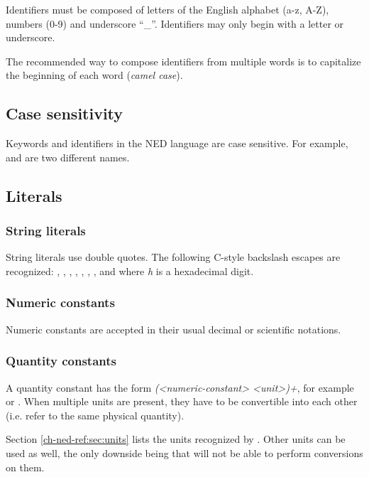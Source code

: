 Identifiers must be composed of letters of the English alphabet (a-z, A-Z),
numbers (0-9) and underscore ``\_''. Identifiers may only begin with a
letter or underscore.

The recommended way to compose identifiers from multiple words is to
capitalize the beginning of each word (\textit{camel case}).

\subsection{Case sensitivity}

Keywords and identifiers in the NED language are case sensitive. For example,
 and  are two different names.

\subsection{Literals}

\subsubsection{String literals}

String literals use double quotes. The following C-style backslash
escapes are recognized: , , , ,
, \ttt{{\textbackslash}{\textbackslash}}, , and  where \textit{h} is a
hexadecimal digit.

\subsubsection{Numeric constants}

Numeric constants are accepted in their usual decimal or
scientific notations.

\subsubsection{Quantity constants}

A quantity constant has the form \textit{(<numeric-constant> <unit>)+}, for
example  or . When multiple units are present,
they have to be convertible into each other (i.e. refer to the same physical
quantity).

Section \ref{ch-ned-ref:sec:units} lists the units recognized by {\opp}.
Other units can be used as well, the only downside being that {\opp} will not be
able to perform conversions on them.

